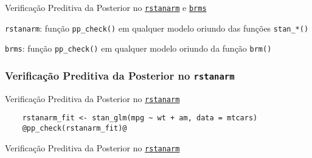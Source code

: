 \begin{frame}{Verificação Preditiva da Posterior no \href{http://mc-stan.org/rstanarm/}{\texttt{rstanarm}} e \href{https://paul-buerkner.github.io/brms/}{\texttt{brms}}}
    \begin{vfilleditems}
        \item \texttt{rstanarm}: função \lstinline!pp_check()! em qualquer modelo oriundo das funções \lstinline!stan_*()!
        \item \texttt{brms}: função \lstinline!pp_check()! em qualquer modelo oriundo da função \lstinline!brm()!
    \end{vfilleditems}
\end{frame}

\subsubsection{Verificação Preditiva da Posterior no \texttt{rstanarm}}
\begin{frame}[fragile]{Verificação Preditiva da Posterior no \href{http://mc-stan.org/rstanarm/}{\texttt{rstanarm}}}
    \begin{lstlisting}
    rstanarm_fit <- stan_glm(mpg ~ wt + am, data = mtcars)
    @pp_check(rstanarm_fit)@
    \end{lstlisting}
\end{frame}

\begin{frame}{Verificação Preditiva da Posterior no \href{http://mc-stan.org/rstanarm/}{\texttt{rstanarm}}}
    \begin{columns}
        \begin{column}{0.5\textwidth}
            \begin{figure}
                \centering
                \resizebox{0.8\columnwidth}{!}{}
            \end{figure}
        \end{column}
    \end{columns}
\end{frame}

